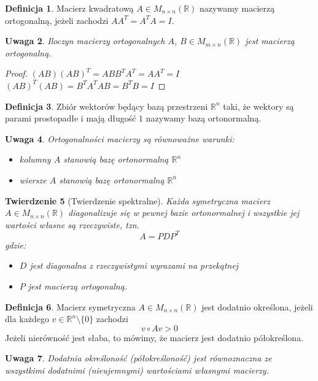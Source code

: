 \documentclass{article}
\newtheorem{theorem}{Twierdzenie}[section]
\newtheorem{att}[theorem]{Uwaga}
\theoremstyle{definition}
\newtheorem{definition}[theorem]{Definicja}
\begin{document}
\begin{definition}
Macierz kwadratową $A \in M_{n \times n} (\mathbb{R}) $ nazywamy macierzą ortogonalną, jeżeli zachodzi $AA^T = A^TA = I$.
\end{definition}

\begin{att}
Iloczyn macierzy ortogonalnych $A$, $B \in M_{m \times n} (\mathbb{R})$ jest macierzą ortogonalną.
\end{att}

\begin{proof}
$(AB)(AB)^T = ABB^TA^T = AA^T=I$ \\ $(AB)^T(AB) = B^TA^TAB = B^TB=I$
\end{proof}

\begin{definition}
Zbiór wektorów będący bazą przestrzeni $\mathbb{R}^n$ taki, że wektory są parami prostopadłe i mają długość $1$ nazywamy bazą ortonormalną.
\end{definition}

\newpage

\begin{att}
Ortogonalności macierzy są równoważne warunki:
\begin{itemize}
    \item kolumny $A$ stanowią bazę ortonormalną $\mathbb{R}^n$
    \item wiersze $A$ stanowią bazę ortonormalną $\mathbb{R}^n$
\end{itemize}
\end{att}
\begin{theorem}[Twierdzenie spektralne]
Każda symetryczna macierz $A \in M_{n \times n} (\mathbb{R} )$ diagonalizuje się w pewnej bazie ortonormalnej  i wszystkie jej wartości własne są rzeczywiste, tzn. $$A = PDP^T $$
gdzie:
\begin{itemize}
    \item $D$ jest diagonalna z rzeczywistymi wyrazami na przekątnej
    \item $P$ jest macierzą ortogonalną.
\end{itemize}
\end{theorem}
\begin{definition}
Macierz symetryczna $A \in M_{n \times n} (\mathbb{R})$ jest dodatnio określona, jeżeli dla każdego $v \in \mathbb{R}^n \setminus \{ 0 \}$ zachodzi
$$ v \circ Av > 0 $$
Jeżeli nierówność jest słaba, to mówimy, że macierz jest dodatnio półokreślona.
\end{definition}
\begin{att}
Dodatnia określoność (półokreśloność) jest równoznaczna ze wszystkimi dodatnimi (nieujemnymi) wartościami własnymi macierzy.
\end{att}
\end{document}
